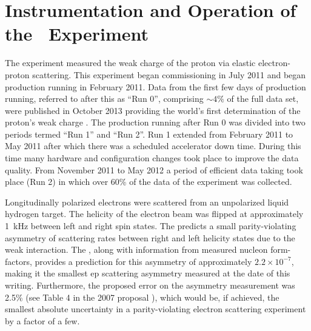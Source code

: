 
\chapter{Instrumentation and Operation of the \Q~Experiment} 
\captionsetup{justification=justified,singlelinecheck=false}

\label{Ch:instrumentation}




The \Qs experiment measured the weak charge of the proton \qwps via elastic electron-proton scattering. This experiment began commissioning in July 2011 and began production running in February 2011. Data from the first few days of production running, referred to after this as ``Run 0'', comprising $\sim 4\%$ of the full data set, were published in October 2013 providing the world's first determination of the proton's weak charge \cite{wien0}. The production running after Run 0 was divided into two periods termed ``Run 1'' and ``Run 2''. Run 1 extended from February 2011 to May 2011 after which there was a scheduled accelerator down time. During this time many hardware and configuration changes took place to improve the data quality. From November 2011 to May 2012 a period of efficient data taking took place (Run 2) in which over 60\% of the data of the experiment was collected.

Longitudinally polarized electrons were scattered from an unpolarized liquid hydrogen target. The helicity of the electron beam was flipped at approximately 1~kHz between left and right spin states. The \sms predicts a small parity-violating asymmetry of scattering rates between right and left helicity states due to the weak interaction. The \sm, along with information from measured nucleon form-factors, provides a prediction for this asymmetry of approximately $2.2\times 10^{-7}$, making it the smallest ep scattering asymmetry measured at the date of this writing. Furthermore, the proposed error on the asymmetry measurement was 2.5\% (see Table 4 in the 2007 proposal \cite{Jeopardy}), which would be, if achieved, the smallest absolute uncertainty in a parity-violating electron scattering experiment by a factor of a few. 

